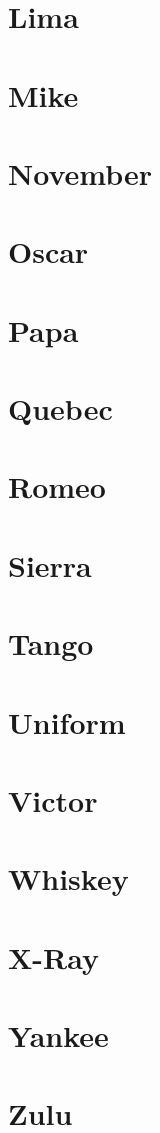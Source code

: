 \documentclass[a4paper]{book}
\begin{document}
\section{Lima}     
\section{Mike}     
\section{November} 
\section{Oscar}    
\section{Papa}     
\section{Quebec}   
\section{Romeo}    
\section{Sierra}   
\section{Tango}    
\section{Uniform}  
\section{Victor}   
\section{Whiskey}  
\section{X-Ray}    
\section{Yankee}   
\section{Zulu}     
\end{document}
